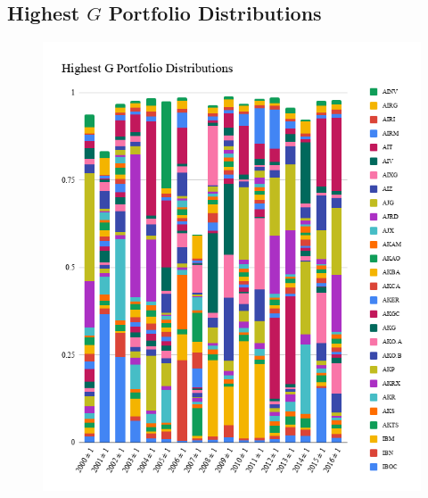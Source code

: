 \documentclass[11pt]{article}
\begin{document}
\subsection{Highest \(G\) Portfolio Distributions}\label{apd:HighestGPortfolioDistributions}
    \begin{figure}[H]
        \includegraphics[width=\textwidth]{HighestGPortfolioDistributions}
    \end{figure}
\end{document}
